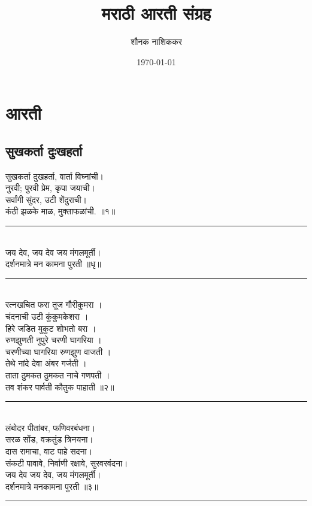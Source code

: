 \documentclass[letterpaper,twocolumn,openany,nodeprecatedcode]{dndbook}
\title{ मराठी आरती संग्रह } \author{ शौनक नाशिककर } \date{\today}
\begin{document}
\frontmatter

\maketitle

\tableofcontents

\mainmatter%

\part{आरती}

\chapter{सुखकर्ता दुःखहर्ता}

सुखकर्ता दुखहर्ता, वार्ता विघ्नांची। \\
नुरवी; पुरवी प्रेम, कृपा जयाची।\\
सर्वांगी सुंदर, उटी शेंदुराची। \\
कंठी झळके माळ, मुक्ताफळांची. ॥१॥ \\
\rule{\linewidth}{1pt} \\
जय देव, जय देव जय मंगलमूर्ती। \\
दर्शनमात्रे मन कामना पुरती ॥धृ॥ \\
\rule{\linewidth}{1pt} \\
रत्नखचित फरा तूज गौरीकुमरा । \\
चंदनाची उटी कुंकुमकेशरा । \\
हिरे जडित मुकुट शोभतो बरा । \\
रुणझुणती नुपुरे चरणी घागरिया । \\
चरणीच्या घागरिया रुणझुण वाजती । \\
तेथे नांदे देवा अंबर गर्जती । \\
ताता ठुमकत ठुमकत नाचे गणपती । \\
तव शंकर पार्वती कौतुक पाहाती ॥२॥ \\
\rule{\linewidth}{1pt} \\
लंबोदर पीतांबर, फणिवरबंधना। \\
सरळ सोंड, वक्रतुंड त्रिनयना। \\
दास रामाचा, वाट पाहे सदना। \\
संकटी पावावे, निर्वाणी रक्षावे, सुरवरवंदना। \\
जय देव जय देव, जय मंगलमूर्ती। \\
दर्शनमात्रे मनकामना पुरती ॥३॥ \\
\rule{\linewidth}{1pt}
\end{document}
